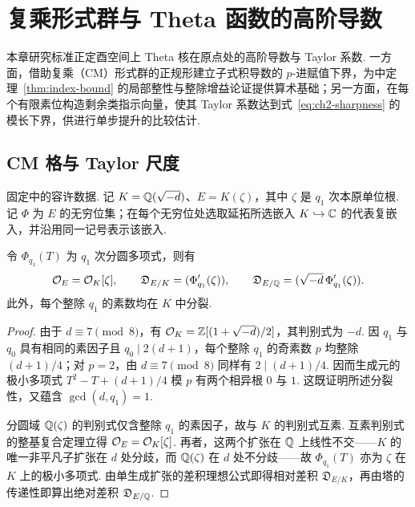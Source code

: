 \chapter{复乘形式群与 Theta 函数的高阶导数}
\label{chap:derivatives}

\begin{chapterguide}
本章研究标准正定酉空间上 Theta 核在原点处的高阶导数与 Taylor 系数. 一方面，借助复乘（CM）形式群的正规形建立子式积导数的 $p$-进赋值下界，为中定理~\ref{thm:index-bound} 的局部整性与整除增益论证提供算术基础；另一方面，在每个有限素位构造剩余类指示向量，使其 Taylor 系数达到式~\eqref{eq:ch2-sharpness} 的模长下界，供进行单步提升的比较估计.
\end{chapterguide}

\section{CM 格与 Taylor 尺度}
\label{sec:ch2-cm-field}

固定中的容许数据. 记 $K=\mathbb{Q}(\sqrt{-d})$、$E=K(\zeta)$，其中 $\zeta$ 是 $q_1$ 次本原单位根. 记 $\Phi$ 为 $E$ 的无穷位集；在每个无穷位处选取延拓所选嵌入 $K\hookrightarrow\mathbb{C}$ 的代表复嵌入，并沿用同一记号表示该嵌入.

\begin{proposition}[分圆扩张的差积理想]
\label{prop:ch2-field-different}
令 $\Phi_{q_1}(T)$ 为 $q_1$ 次分圆多项式，则有
\begin{equation}
\label{eq:ch2-different}
 \mathcal{O}_E=\mathcal{O}_K[\zeta],\qquad
 \mathfrak D_{E/K}=(\Phi_{q_1}'(\zeta)),\qquad
 \mathfrak D_{E/\mathbb{Q}}=(\sqrt{-d}\,\Phi_{q_1}'(\zeta)).
\end{equation}
此外，每个整除 $q_1$ 的素数均在 $K$ 中分裂.
\end{proposition}

\begin{proof}
由于 $d\equiv7\pmod8$，有 $\mathcal{O}_K=\mathbb{Z}[(1+\sqrt{-d})/2]$，其判别式为 $-d$. 因 $q_1$ 与 $q_0$ 具有相同的素因子且 $q_0\mid2(d+1)$，每个整除 $q_1$ 的奇素数 $p$ 均整除 $(d+1)/4$；对 $p=2$，由 $d\equiv7\pmod8$ 同样有 $2\mid(d+1)/4$. 因而生成元的极小多项式 $T^2-T+(d+1)/4$ 模 $p$ 有两个相异根 $0$ 与 $1$. 这既证明所述分裂性，又蕴含 $\gcd(d,q_1)=1$.

分圆域 $\mathbb{Q}(\zeta)$ 的判别式仅含整除 $q_1$ 的素因子，故与 $K$ 的判别式互素. 互素判别式的整基复合定理立得 $\mathcal{O}_E=\mathcal{O}_K[\zeta]$. 再者，这两个扩张在 $\mathbb{Q}$ 上线性不交——$K$ 的唯一非平凡子扩张在 $d$ 处分歧，而 $\mathbb{Q}(\zeta)$ 在 $d$ 处不分歧——故 $\Phi_{q_1}(T)$ 亦为 $\zeta$ 在 $K$ 上的极小多项式. 由单生成扩张的差积理想公式即得相对差积 $\mathfrak D_{E/K}$，再由塔的传递性即算出绝对差积 $\mathfrak D_{E/\mathbb{Q}}$.
\end{proof}

